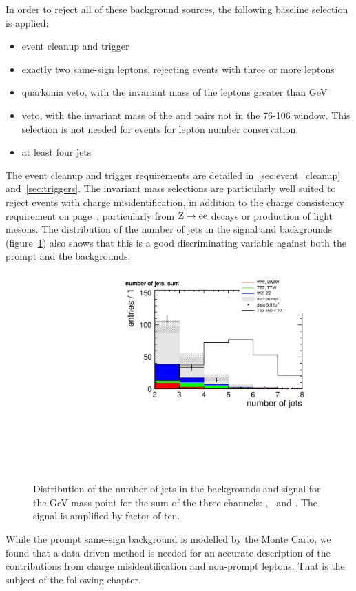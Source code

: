 In order to reject all of these background sources, the following baseline
selection is applied:
\begin{itemize}
    \item event cleanup and trigger
    \item exactly two same-sign leptons, rejecting events with three or more
        leptons
    \item quarkonia veto, with the invariant mass of the leptons greater
        than \unit[20]{GeV}
    \item \Z veto, with the invariant mass of the \E\E and \M\M pairs not in
        the 76-106 window. This selection is not needed for \E\M
        events for lepton number conservation.
    \item at least four jets
\end{itemize}
The event cleanup and trigger requirements are detailed
in~\ref{sec:event_cleanup} and~\ref{sec:triggers}.
The invariant mass selections are particularly well suited to 
reject events with charge misidentification, in addition to the charge
consistency requirement on page~\pageref{page:electron_charge}, particularly from $\mathrm{Z}
\rightarrow \mathrm{e}\mathrm{e}$ decays or production of light mesons. 
The distribution of the number of jets in the signal and backgrounds
(figure~\ref{fig:n_jets}) also
shows that this is a good discriminating variable against both the
prompt and the \ttbar backgrounds.

\begin{figure}[htb]
    \centering
    \includegraphics[width=.7\textwidth]{images/pdf/n_jets_sum}

    \caption{Distribution of the number of jets in the backgrounds and
        signal for the \unit[550]{GeV} mass point for the sum of the three channels:
    \E\E, \E\M\ and \M\M. The signal is amplified by factor of ten.}
    \label{fig:n_jets}
\end{figure}

While the prompt same-sign background is modelled by the Monte Carlo, we
found that a data-driven method is needed for an accurate description of the
contributions from charge misidentification and non-prompt leptons.
That is the subject of the following chapter.

